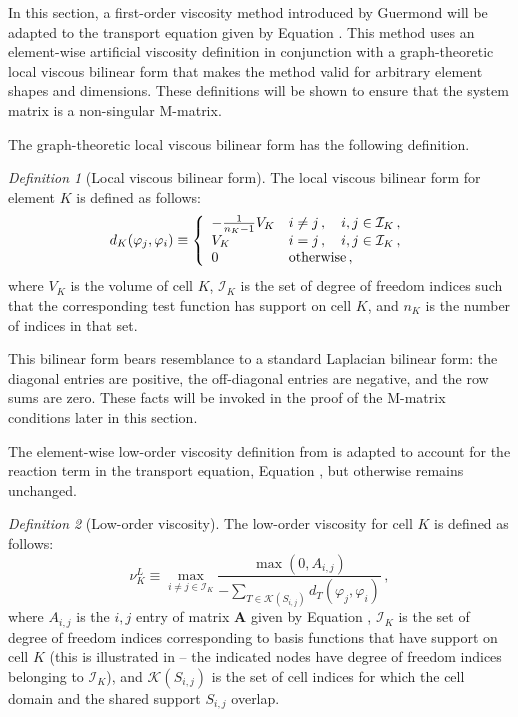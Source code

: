 \documentclass[xchauthor,chkrefs,fixeqskip,GCNS,amsmath,amsthm]{yjcphg}
\theoremstyle{remark}
\newtheorem{defn}{Definition}
\begin{document}
In this section, a first-order viscosity method introduced by Guermond
\cite{guermond_firstorder} will be adapted to the transport
equation given by Equation . This method uses an
element-wise artificial viscosity definition in conjunction with a
graph-theoretic local viscous bilinear form that makes the method valid
for arbitrary element shapes and dimensions. These definitions will be
shown to ensure that the system matrix is a non-singular M-matrix.

The graph-theoretic local viscous bilinear form has the following
definition.

\begin{defn}[Local viscous bilinear form] The local viscous bilinear form for
element $K$ is defined as follows:
%
\begin{equation}
\label{eq:bilinearform}
d_{K}(\varphi_{j},\varphi_{i}) \equiv\left\{
%
\begin{array}{l@{\quad} l}
-\frac{1}{n_{K} - 1}V_{K} & i\ne j\,,\quad i,j\in\mathcal{I}_{K}\,,
\\
V_{K} & i = j \,,\quad i,j\in\mathcal{I}_{K}\,,
\\
0 & \mbox{otherwise}\,,
\end{array}
%
\right.
\end{equation}
%
where $V_{K}$ is the volume of cell $K$, $\mathcal{I}_{K}$ is the set
of degree of freedom indices such that the corresponding test function
has support on cell $K$, and $n_{K}$ is the number of indices in that
set.
\end{defn}

This bilinear form bears resemblance to a standard Laplacian bilinear
form: the diagonal entries are positive, the off-diagonal entries are
negative, and the row sums are zero. These facts will be invoked in the
proof of the M-matrix conditions later in this section.

The element-wise low-order viscosity definition from
\cite{guermond_firstorder} is adapted to account for the reaction term
in the transport equation, Equation , but
otherwise remains unchanged.

\begin{defn}[Low-order viscosity] The low-order viscosity for cell $K$ is defined
as follows:
%
\begin{equation}
\nu^{L}_{K} \equiv\max\limits_{i\ne j\in\mathcal{I}_{K}}
\frac{
\max(0,A_{i,j})}{-\sum\limits_{T\in\mathcal{K}(S_{i,j})}d_{T}(
\varphi_{j},\varphi_{i})}
\,,
\end{equation}
%
where $A_{i,j}$ is the $i,j$ entry of matrix $\mathbf{A}$ given by
Equation , $\mathcal{I}_{K}$ is the set of degree of
freedom indices corresponding to basis functions that have support on
cell $K$ (this is illustrated in  -- the
indicated nodes have degree of freedom indices belonging to
$\mathcal{I}_{K}$), and $\mathcal{K}(S_{i,j})$ is the set of cell
indices for which the cell domain and the shared support $S_{i,j}$
overlap.
\end{defn}
\end{document}
